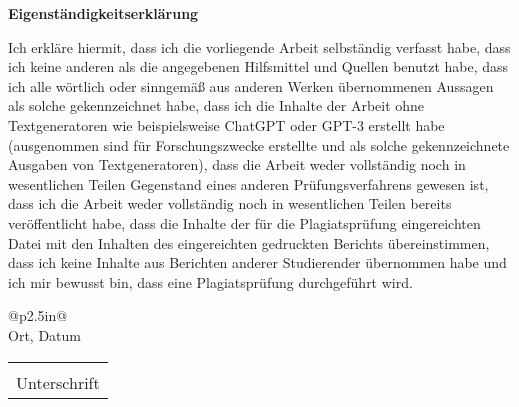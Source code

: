\documentclass[a4paper, 12pt]{proc}
\begin{document}
\begin{center}
    \textbf{Eigenständigkeitserklärung}
\end{center}
Ich erkläre hiermit, dass ich die vorliegende Arbeit selbständig verfasst habe,
dass ich keine anderen als die angegebenen Hilfsmittel und Quellen benutzt
habe, dass ich alle wörtlich oder sinngemäß aus anderen Werken übernommenen
Aussagen als solche gekennzeichnet habe, dass ich die Inhalte der Arbeit ohne
Textgeneratoren wie beispielsweise ChatGPT oder GPT-3 erstellt habe
(ausgenommen sind für Forschungszwecke erstellte und als solche gekennzeichnete
Ausgaben von Textgeneratoren), dass die Arbeit weder vollständig noch in
wesentlichen Teilen Gegenstand eines anderen Prüfungsverfahrens gewesen ist,
dass ich die Arbeit weder vollständig noch in wesentlichen Teilen bereits
veröffentlicht habe, dass die Inhalte der für die Plagiatsprüfung eingereichten
Datei mit den Inhalten des eingereichten gedruckten Berichts übereinstimmen,
dass ich keine Inhalte aus Berichten anderer Studierender übernommen habe und
ich mir bewusst bin, dass eine Plagiatsprüfung durchgeführt wird.\\

\vspace{25mm}
\begin{minipage}{0.5\linewidth}
    \centering
        \begin{tabular}{@{}p{2.5in}@{}}
            \hrulefill \\
            Ort, Datum\\
        \end{tabular}
\end{minipage}
\vspace{25mm}
\begin{minipage}{0.5\linewidth}
    \centering
        \begin{tabular}{@{}p{2.5in}@{}}
            \hrulefill \\
            Unterschrift\\
        \end{tabular}
\end{minipage}
\end{document}
